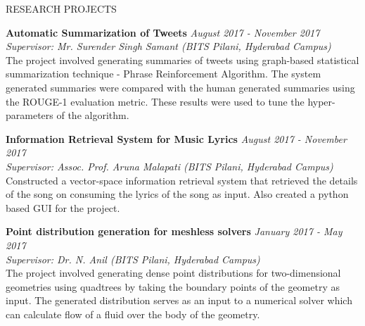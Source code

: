 \documentclass{resume} %
\begin{document}

\begin{rSection}{RESEARCH PROJECTS} \itemsep -3pt  



{\bf Automatic Summarization of Tweets } \hfill {\it August 2017 - November 2017}\\ 
{\it Supervisor: Mr. Surender Singh Samant (BITS Pilani, Hyderabad Campus)}
\\The project involved generating summaries of tweets using graph-based statistical summarization technique - Phrase Reinforcement Algorithm. The system generated summaries were compared with the human generated summaries using the ROUGE-1 evaluation metric. These results were used to tune the hyper-parameters of the algorithm. 

{\bf Information Retrieval System for Music Lyrics} \hfill {\it August 2017 - November 2017}\\ 
{\it Supervisor: Assoc. Prof. Aruna Malapati (BITS Pilani, Hyderabad Campus)}
\\ Constructed a vector-space information retrieval system that retrieved the details of the song on consuming the lyrics of the song as input. Also created a python based GUI for the project.

{\bf Point distribution generation for meshless solvers } \hfill {\it January 2017 - May 2017}\\ 
{\it Supervisor: Dr. N. Anil (BITS Pilani, Hyderabad Campus)}
\\ The project involved generating dense point distributions for two-dimensional geometries using quadtrees by taking the boundary points of the geometry as input. The generated distribution serves as an input to a numerical solver which can calculate flow of a fluid over the body of the geometry. 


\end{rSection}
\end{document}
